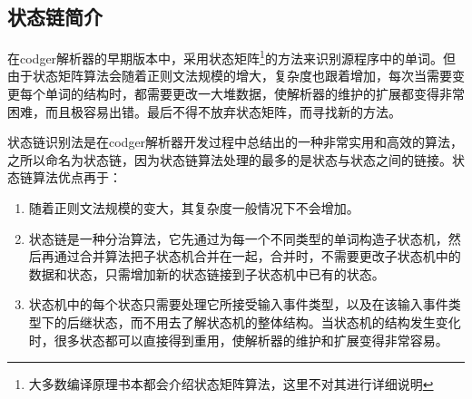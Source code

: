 \subsection{状态链简介}
在codger解析器的早期版本中，采用状态矩阵\footnote{大多数编译原理书本都会介绍状态矩阵算法，这里不对其进行详细说明}的方法来识别源程序中的单词。但由于状态矩阵算法会随着正则文法规模的增大，复杂度也跟着增加，每次当需要变更每个单词的结构时，都需要更改一大堆数据，使解析器的维护的扩展都变得非常困难，而且极容易出错。最后不得不放弃状态矩阵，而寻找新的方法。

状态链识别法是在codger解析器开发过程中总结出的一种非常实用和高效的算法，之所以命名为状态链，因为状态链算法处理的最多的是状态与状态之间的链接。状态链算法优点再于：
\begin{enumerate}
 \item 随着正则文法规模的变大，其复杂度一般情况下不会增加。
 \item 状态链是一种分治算法，它先通过为每一个不同类型的单词构造子状态机，然后再通过合并算法把子状态机合并在一起，合并时，不需要更改子状态机中的数据和状态，只需增加新的状态链接到子状态机中已有的状态。
 \item 状态机中的每个状态只需要处理它所接受输入事件类型，以及在该输入事件类型下的后继状态，而不用去了解状态机的整体结构。当状态机的结构发生变化时，很多状态都可以直接得到重用，使解析器的维护和扩展变得非常容易。
\end{enumerate}
